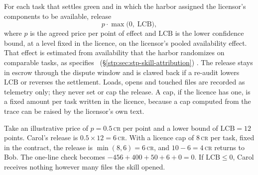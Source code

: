 \begin{definition}\label{def:he-effect-royalty}
\setlength{\parskip}{4pt plus 1pt}
For each task that settles green and in which the harbor assigned the
licensor's components to be available, release
\[
  p\cdot\max\bigl(0,\;\mathrm{LCB}\bigr),
\]
where $p$ is the agreed price per point of effect and $\mathrm{LCB}$ is the lower
confidence bound, at a level fixed in the licence, on the licensor's pooled
availability effect. That effect is estimated from availability that the
harbor randomizes on comparable tasks, as 
specifies%
\ifpdbook
\ (\S\ref{stp:sec:stp-skill-attribution})%
\fi
. The release stays in escrow through the dispute window and is clawed back
if a re-audit lowers $\mathrm{LCB}$ or reverses the settlement. Loads, opens and
touched files are recorded as telemetry only; they never set or cap the release. A cap,
if the licence has one, is a fixed amount per task written in the licence,
because a cap computed from the trace can be raised by the licensor's own text.
\end{definition}

\noindent Take an illustrative price of $p=0.5$\,\textsc{cr} per point and a
lower bound of $\mathrm{LCB}=12$ points. Carol's release is $0.5\times12=6$\,\textsc{cr}.
With a licence cap of $8$\,\textsc{cr} per task, fixed in the contract, the
release is $\min(8,6)=6$\,\textsc{cr}, and $10-6=4$\,\textsc{cr} returns to
Bob. The
one-line check becomes $-456+400+50+6+0=0$. If $\mathrm{LCB}\le0$, Carol receives
nothing however many files the skill opened.

\pdexercisepointer{\ref{ex:he-meter-steering-edit}}{\ref{ex:he-sybil-licensor}}{\pageref{ex:he-meter-steering-edit}}
